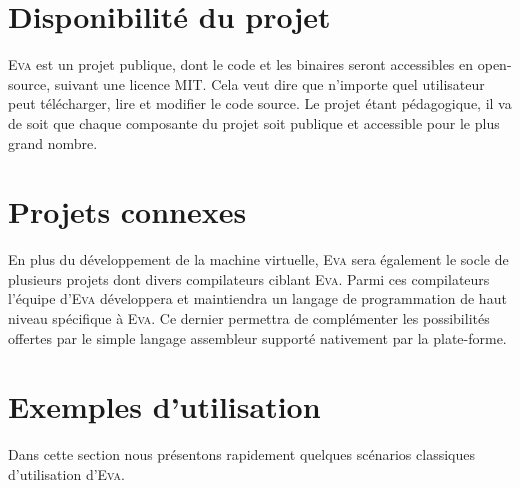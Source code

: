 \documentclass[11pt,twoside]{article}
\newcommand{\noun}[1]{\textsc{#1}}
\begin{document}
\section{Disponibilité du projet}

\noun{Eva} est un projet publique, dont le code et les binaires seront
accessibles en open-source, suivant une licence MIT. Cela veut dire
que n'importe quel utilisateur peut télécharger, lire et modifier
le code source. Le projet étant pédagogique, il va de soit que chaque
composante du projet soit publique et accessible pour le plus grand nombre.

\section{Projets connexes}

En plus du développement de la machine virtuelle, \noun{Eva} sera
également le socle de plusieurs projets dont divers compilateurs ciblant
\noun{Eva}. Parmi ces compilateurs l'équipe d'\noun{Eva} développera et maintiendra
un langage de programmation de haut niveau spécifique à \noun{Eva}. Ce dernier
permettra de complémenter les possibilités offertes par le simple langage
assembleur supporté nativement par la plate-forme.

\section{Exemples d’utilisation}

Dans cette section nous présentons rapidement quelques scénarios classiques d'utilisation d'\noun{Eva}.
\end{document}
